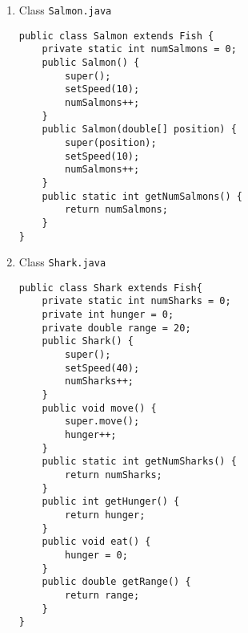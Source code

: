 \documentclass[12pt,letterpaper,twoside]{article}
\begin{document}
\begin{enumerate}
\begin{lstlisting}
	// attributes
	private double posRho;
	private double posAng;
	private double speed;
	// methods
	public void move() {
		double oldX = posRho * Math.cos(posAng);
		double oldY = posRho * Math.sin(posAng);
		while (true) {
			double theta = Math.random() * 2 * Math.PI;
			double newX = oldX + speed*Math.cos(theta);
			double newY = oldY + speed*Math.sin(theta);
			double newRho = Math.sqrt(Math.pow(newX,2) + Math.pow(newY,2));
			if (newRho < Pond.getRadius()) {
				posRho = newRho;
				posAng = Math.atan2(newY, newX);
				break;
			}
		}
	}
	// constructor
	public Fish() {
		posRho = Math.random() * Pond.getRadius();
		posAng = Math.random() * 2 * Math.PI;
		numFish++;
	}
	public Fish(double[] position) {
		posRho = Math.sqrt(Math.pow(position[0], 2) + Math.pow(position[1], 2));
		posAng = Math.atan2(position[1], position[0]);
		numFish++;
	}
	// getter and setter for position
	public void setSpeed(double speed) {
		this.speed = speed;
	}
	public static int getNumFish() {
		return numFish;
	}
	public double[] getPosition() {
		double[] position = new double[2];
		position[0] = posRho * Math.cos(posAng);
		position[1] = posRho * Math.sin(posAng);
		return position;
	}
}
\end{lstlisting}
\item Class \texttt{Salmon.java}
\lstset{language=java, tabsize=2}
\begin{lstlisting}
public class Salmon extends Fish {
	private static int numSalmons = 0;
	public Salmon() {
		super();
		setSpeed(10);
		numSalmons++;
	}
	public Salmon(double[] position) {
		super(position);
		setSpeed(10);
		numSalmons++;
	}
	public static int getNumSalmons() {
		return numSalmons;
	}
}
\end{lstlisting}
\item Class \texttt{Shark.java}
\lstset{language=java, tabsize=2}
\begin{lstlisting}
public class Shark extends Fish{
	private static int numSharks = 0;
	private int hunger = 0;
	private double range = 20;
	public Shark() {
		super();
		setSpeed(40);
		numSharks++;
	}
	public void move() {
		super.move();
		hunger++;
	}
	public static int getNumSharks() {
		return numSharks;
	}
	public int getHunger() {
		return hunger;
	}
	public void eat() {
		hunger = 0;
	}
	public double getRange() {
		return range;
	}
}
\end{lstlisting}
\end{enumerate}
\end{document}
